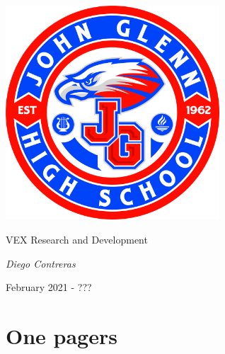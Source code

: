 \documentclass[12pt]{article}
\begin{document}

\begin{titlepage}
	\centering
	\includegraphics[width=8cm]{jghs_logo}\par\vspace{1cm}
	\vspace{1cm}
	\vspace{1cm}
	{\huge VEX Research and Development\par}
	\vspace{1cm}
	{\Large\itshape Diego Contreras\par}
	\vfill
	\vfill
	{\large February 2021 - ???}
\end{titlepage}

\newpage
\tableofcontents











\section{One pagers}











\end{document}
